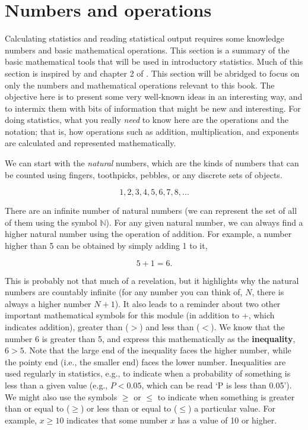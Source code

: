 \documentclass[
]{scrbook}
\begin{document}
\hypertarget{numbers-and-operations}{%
\section{Numbers and operations}\label{numbers-and-operations}}

Calculating statistics and reading statistical output requires some knowledge numbers and basic mathematical operations.
This section is a summary of the basic mathematical tools that will be used in introductory statistics.
Much of this section is inspired by \citet{Courant1996} and chapter 2 of \citet{Pastor2008}.
This section will be abridged to focus on only the numbers and mathematical operations relevant to this book.
The objective here is to present some very well-known ideas in an interesting way, and to intermix them with bits of information that might be new and interesting.
For doing statistics, what you really \emph{need} to know here are the operations and the notation; that is, how operations such as addition, multiplication, and exponents are calculated and represented mathematically.

We can start with the \emph{natural} numbers, which are the kinds of numbers that can be counted using fingers, toothpicks, pebbles, or any discrete sets of objects.

\[1, 2, 3, 4, 5, 6, 7, 8, ...\]

There are an infinite number of natural numbers (we can represent the set of all of them using the symbol \(\mathbb{N}\)).
For any given natural number, we can always find a higher natural number using the operation of addition.
For example, a number higher than 5 can be obtained by simply adding 1 to it,

\[5 + 1 = 6.\]

This is probably not that much of a revelation, but it highlights why the natural numbers are countably infinite (for any number you can think of, \(N\), there is always a higher number \(N + 1\)).
It also leads to a reminder about two other important mathematical symbols for this module (in addition to \(+\), which indicates addition), greater than (\(>\)) and less than (\(<\)).
We know that the number 6 is greater than 5, and express this mathematically as the \textbf{inequality}, \(6 > 5\).
Note that the large end of the inequality faces the higher number, while the pointy end (i.e., the smaller end) faces the lower number.
Inequalities are used regularly in statistics, e.g., to indicate when a probability of something is less than a given value (e.g., \(P < 0.05\), which can be read `P is less than 0.05').
We might also use the symbols \(\geq\) or \(\leq\) to indicate when something is greater than or equal to (\(\geq\)) or less than or equal to (\(\leq\)) a particular value.
For example, \(x \geq 10\) indicates that some number \(x\) has a value of 10 or higher.
\end{document}
